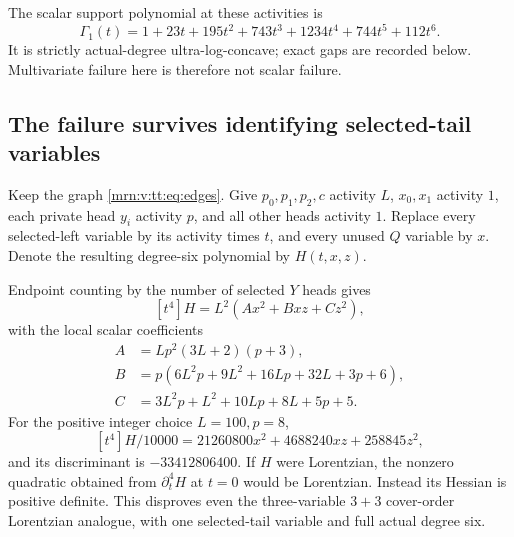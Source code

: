 \documentclass[11pt,a4paper]{article}
\theoremstyle{remark}\newtheorem{remark}[theorem]{Remark}
\begin{document}
The scalar support polynomial at these activities is
\begin{equation}\label{mrn:v:tt:eq:gamma1}
 \Gamma_1(t)=1+23t+195t^2+743t^3+1234t^4+744t^5+112t^6.
\end{equation}
It is strictly actual-degree ultra-log-concave; exact gaps are recorded below. Multivariate failure here is therefore not scalar failure.

\subsection{The failure survives identifying selected-tail variables}\label{mrn:v:tt:sec:identify}
Keep the graph \eqref{mrn:v:tt:eq:edges}. Give $p_0,p_1,p_2,c$ activity $L$, $x_0,x_1$ activity $1$, each private head $y_i$ activity $p$, and all other heads activity $1$. Replace every selected-left variable by its activity times $t$, and every unused $Q$ variable by $x$. Denote the resulting degree-six polynomial by $H(t,x,z)$.

Endpoint counting by the number of selected $Y$ heads gives
\begin{equation}\label{mrn:v:tt:eq:t4}
 [t^4]H=L^2(Ax^2+Bxz+Cz^2),
\end{equation}
with the local scalar coefficients
\begin{align*}
 A&=Lp^2(3L+2)(p+3),\\
 B&=p(6L^2p+9L^2+16Lp+32L+3p+6),\\
 C&=3L^2p+L^2+10Lp+8L+5p+5.
\end{align*}
For the positive integer choice $L=100,p=8$,
\[
 [t^4]H/10000=21260800x^2+4688240xz+258845z^2,
\]
and its discriminant is $-33412806400$. If $H$ were Lorentzian, the nonzero quadratic obtained from $\partial_t^4H$ at $t=0$ would be Lorentzian. Instead its Hessian is positive definite. This disproves even the three-variable $3+3$ cover-order Lorentzian analogue, with one selected-tail variable and full actual degree six.
\end{document}
